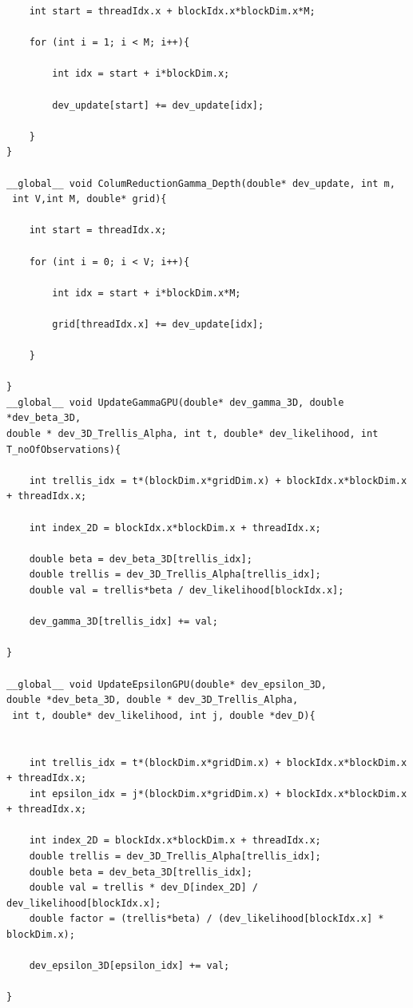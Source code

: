 \documentclass[english, paper=a4]{scrartcl}
\begin{document}
\begin{verbatim}
	int start = threadIdx.x + blockIdx.x*blockDim.x*M;

	for (int i = 1; i < M; i++){

		int idx = start + i*blockDim.x;

		dev_update[start] += dev_update[idx];

	}
}

__global__ void ColumReductionGamma_Depth(double* dev_update, int m,
 int V,int M, double* grid){

	int start = threadIdx.x;
	
	for (int i = 0; i < V; i++){

		int idx = start + i*blockDim.x*M;

		grid[threadIdx.x] += dev_update[idx];

	}

}
__global__ void UpdateGammaGPU(double* dev_gamma_3D, double *dev_beta_3D, 
double * dev_3D_Trellis_Alpha, int t, double* dev_likelihood, int T_noOfObservations){

	int trellis_idx = t*(blockDim.x*gridDim.x) + blockIdx.x*blockDim.x + threadIdx.x;

	int index_2D = blockIdx.x*blockDim.x + threadIdx.x;

	double beta = dev_beta_3D[trellis_idx];
	double trellis = dev_3D_Trellis_Alpha[trellis_idx];
	double val = trellis*beta / dev_likelihood[blockIdx.x];

	dev_gamma_3D[trellis_idx] += val;

}

__global__ void UpdateEpsilonGPU(double* dev_epsilon_3D, 
double *dev_beta_3D, double * dev_3D_Trellis_Alpha,
 int t, double* dev_likelihood, int j, double *dev_D){


	int trellis_idx = t*(blockDim.x*gridDim.x) + blockIdx.x*blockDim.x + threadIdx.x;
	int epsilon_idx = j*(blockDim.x*gridDim.x) + blockIdx.x*blockDim.x + threadIdx.x;

	int index_2D = blockIdx.x*blockDim.x + threadIdx.x;
	double trellis = dev_3D_Trellis_Alpha[trellis_idx];
	double beta = dev_beta_3D[trellis_idx];
	double val = trellis * dev_D[index_2D] / dev_likelihood[blockIdx.x];
	double factor = (trellis*beta) / (dev_likelihood[blockIdx.x] * blockDim.x);

	dev_epsilon_3D[epsilon_idx] += val;

}
\end{verbatim}




\end{document}
